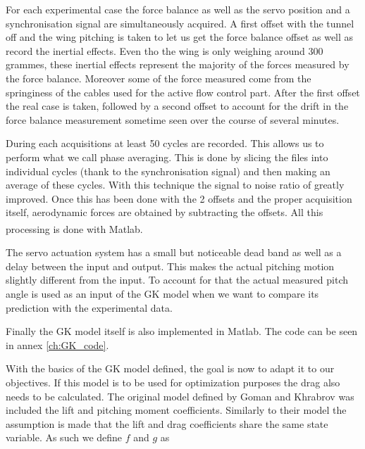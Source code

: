 \par For each experimental case the force balance as well as the servo position and a synchronisation signal are simultaneously acquired.
A first offset with the tunnel off and the wing pitching is taken to let us get the force balance offset as well as record the inertial effects.
Even tho the wing is only weighing around 300 grammes, these inertial effects represent the majority of the forces measured by the force balance.
Moreover some of the force measured come from the springiness of the cables used for the active flow control part.
After the first offset the real case is taken, followed by a second offset to account for the drift in the force balance measurement sometime seen over the course of several minutes.

\par During each acquisitions at least 50 cycles are recorded.
This allows us to perform what we call phase averaging.
This is done by slicing the files into individual cycles (thank to the synchronisation signal) and then making an average of these cycles.
With this technique the signal to noise ratio of greatly improved.
Once this has been done with the 2 offsets and the proper acquisition itself, aerodynamic forces are obtained by subtracting the offsets.
All this processing is done with Matlab\textsuperscript{\textregistered}. 

\par The servo actuation system has a small but noticeable dead band as well as a delay between the input and output.
This makes the actual pitching motion slightly different from the input.
To account for that the actual measured pitch angle is used as an input of the GK model when we want to compare its prediction with the experimental data.

\par Finally the GK model itself is also implemented in Matlab.
The code can be seen in annex \ref{ch:GK_code}.


With the basics of the GK model defined, the goal is now to adapt it to our objectives.
If this model is to be used for optimization purposes the drag also needs to be calculated.
The original model defined by Goman and Khrabrov was included the lift and pitching moment coefficients.
Similarly to their model the assumption is made that the lift and drag coefficients share the same state variable.
As such we define $f$ and $g$ as

